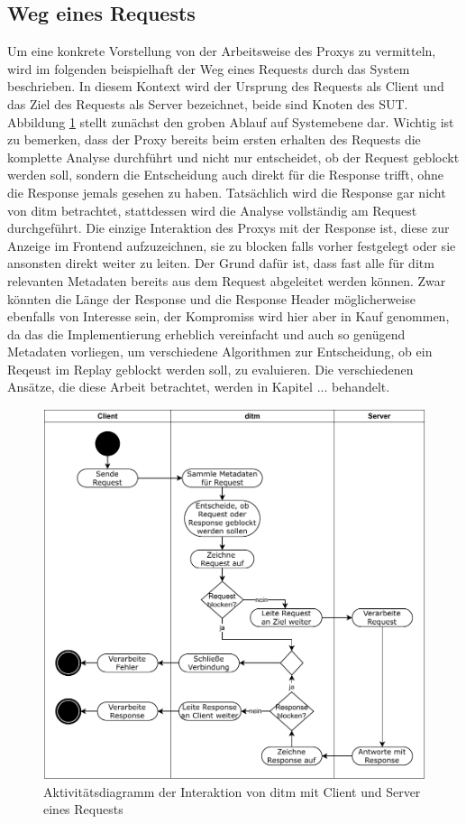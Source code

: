 \documentclass[12pt,a4paper]{report}
\begin{document}
\subsection{Weg eines Requests}
Um eine konkrete Vorstellung von der Arbeitsweise des Proxys zu vermitteln, wird im folgenden beispielhaft der Weg eines
Requests durch das System beschrieben. In diesem Kontext wird der Ursprung des Requests als Client und das Ziel des
Requests als Server bezeichnet, beide sind Knoten des SUT. Abbildung \ref{fig:activity} stellt zunächst den groben Ablauf auf Systemebene dar.
Wichtig ist zu bemerken, dass der Proxy bereits beim ersten erhalten des Requests die komplette Analyse durchführt und
nicht nur entscheidet, ob der Request geblockt werden soll, sondern die Entscheidung auch direkt für die Response trifft,
ohne die Response jemals gesehen zu haben. Tatsächlich wird die Response gar nicht von ditm betrachtet, stattdessen wird
die Analyse vollständig am Request durchgeführt. Die einzige Interaktion des Proxys mit der Response ist, diese zur Anzeige im
Frontend aufzuzeichnen, sie zu blocken falls vorher festgelegt oder sie ansonsten direkt weiter zu leiten.
Der Grund dafür ist, dass fast alle für ditm relevanten Metadaten bereits aus dem Request abgeleitet werden können. Zwar
könnten die Länge der Response und die Response Header möglicherweise ebenfalls von Interesse sein, der Kompromiss wird
hier aber in Kauf genommen, da das die Implementierung erheblich vereinfacht und auch so genügend Metadaten vorliegen,
um verschiedene Algorithmen zur Entscheidung, ob ein Reqeust im Replay geblockt werden soll, zu evaluieren.
Die verschiedenen Ansätze, die diese Arbeit betrachtet, werden in Kapitel ... behandelt.
\begin{figure}[H]
	\centering
	\includegraphics[width=\linewidth]{img/ditm-Activity.pdf}
	\caption{Aktivitätsdiagramm der Interaktion von ditm mit Client und Server eines Requests}
	\label{fig:activity}
\end{figure}
\end{document}
